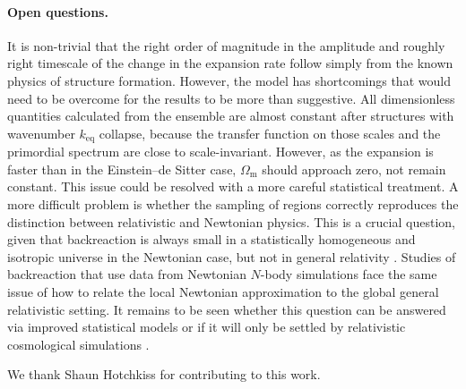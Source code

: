 \documentclass[11pt, a4paper]{article}
\newcommand{\para}{\paragraph}
\newcommand{\keq}{k_{\mathrm{eq}}}
\newcommand{\Om}{\Omega_{\mathrm{m}}}
\begin{document}
\para{Open questions.}

It is non-trivial that the right order of magnitude in the amplitude and roughly right timescale of the change in the expansion rate follow simply from the known physics of structure formation. However, the model has shortcomings that would need to be overcome for the results to be more than suggestive. All dimensionless quantities calculated from the ensemble are almost constant after structures with wavenumber $\keq$ collapse, because the transfer function on those scales and the primordial spectrum are close to scale-invariant. However, as the expansion is faster than in the Einstein--de Sitter case, $\Om$ should approach zero, not remain constant.
This issue could be resolved with a more careful statistical treatment. A more difficult problem is whether the sampling of regions correctly reproduces the distinction between relativistic and Newtonian physics. This is a crucial question, given that backreaction is always small in a statistically homogeneous and isotropic universe in the Newtonian case, but not in general relativity \cite{Buchert:1995fz, Buchert:1999mc, Lavinto:2013exa}. Studies of backreaction that use data from Newtonian $N$-body simulations \cite{Wiegand:2010uh, *Wiegand:2011gs, *Roukema:2013cya, *Racz:2016rss, *Roukema:2017doi} face the same issue of how to relate the local Newtonian approximation to the global general relativistic setting.
It remains to be seen whether this question can be answered via improved statistical models or if it will only be settled by relativistic cosmological simulations \cite{Adamek:2013wja, *Adamek:2014gva, *Adamek:2014xba, *Adamek:2015eda, *Adamek:2016zes, Yoo:2012jz, *Bentivegna:2012ei, *Bentivegna:2013ata, *Adamek:2015hqa, *Bentivegna:2016fls, bentivegna:2015flc, *Giblin:2015vwq, *Mertens:2015ttp, *Macpherson:2016ict, *Giblin:2017juu}.

\acknowledgments

We thank Shaun Hotchkiss for contributing to this work.



\end{document}
